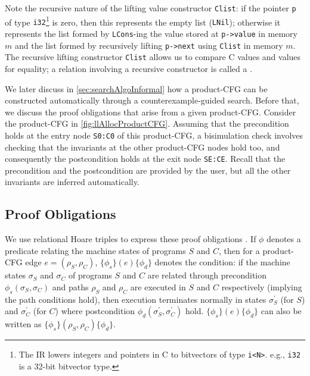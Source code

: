 Note the recursive nature of the lifting value constructor {\tt Clist}: if the pointer {\tt p} of type {\tt i32}\footnote{The IR lowers integers and pointers in C to bitvectors of type {\tt i<N>}. e.g., {\tt i32} is a 32-bit bitvector type.} is zero, then this represents the empty list ({\tt LNil}); otherwise it represents the list formed by {\tt LCons}-ing
the value stored at {\tt p->value} in memory $m$ and the list formed by recursively lifting {\tt p->next} using
{\tt Clist} in memory $m$.  The recursive lifting
constructor {\tt Clist} allows us to compare C values and \SpecL{} values for equality; a
relation involving a recursive constructor is called a {\em \recursiveRelation{}}.

We later discuss in \cref{sec:searchAlgoInformal}
how a product-CFG can be constructed automatically through a counterexample-guided
search. Before that, we discuss the proof obligations that arise from a given
product-CFG. Consider the
product-CFG in \cref{fig:llAllocProductCFG}. Assuming that the precondition  holds at the entry node
{\tt S0:C0} of this product-CFG, a bisimulation
check involves checking that the invariants at the other
product-CFG nodes hold too, and consequently the postcondition 
holds at the exit node {\tt SE:CE}.
Recall that the precondition  and the postcondition 
are provided by the user, but all the other invariants are inferred automatically.

\subsection{Proof Obligations}
\label{sec:proofObligations}
We use relational Hoare triples to express these proof obligations \cite{relationalHoareLogic,hoareTriple}.
If $\phi$ denotes a predicate relating the machine states
of programs $S$ and $C$, then for a product-CFG edge $e=(\rho_S,\rho_C)$,
$\{\phi_s\} (e) \{\phi_d\}$ denotes the condition:
if the machine states $\sigma_S$ and $\sigma_C$ of programs $S$
and $C$ are related through precondition $\phi_s(\sigma_S,\sigma_C)$ and
paths $\rho_S$ and $\rho_C$ are executed in $S$
and $C$ respectively (implying the path conditions
hold), then execution terminates normally in states $\sigma_S^{'}$ (for $S$)
and $\sigma_C^{'}$ (for $C$) where
postcondition $\phi_d(\sigma_S^{'}, \sigma_C^{'})$ hold.
$\{\phi_s\} (e) \{\phi_d\}$ can also be written as
$\{\phi_s\} (\rho_S,\rho_C) \{\phi_d\}$.

